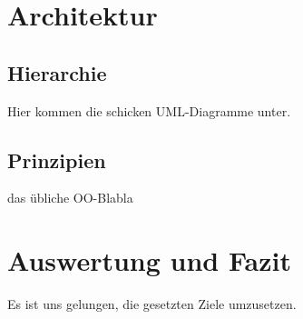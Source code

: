 \section{Architektur}  %

\subsection{Hierarchie}  %
Hier kommen die schicken UML-Diagramme unter.

\subsection{Prinzipien}  %
das übliche OO-Blabla

\section{Auswertung und Fazit}  %

Es ist uns gelungen, die gesetzten Ziele umzusetzen.




\appendix
\printbibliography[heading=bibintoc,title={Quellenverzeichnis}]
\listoffigures


